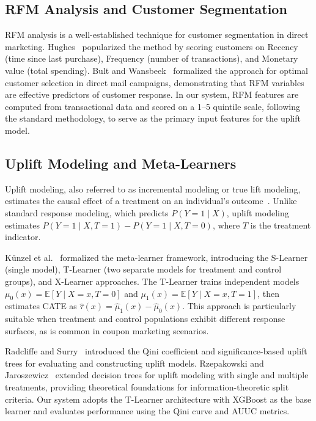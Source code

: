 \documentclass[11pt,a4paper,twoside]{article}
\begin{document}
\subsection{RFM Analysis and Customer Segmentation}

RFM analysis is a well-established technique for customer segmentation in direct marketing. Hughes~\cite{hughes1994} popularized the method by scoring customers on Recency (time since last purchase), Frequency (number of transactions), and Monetary value (total spending). Bult and Wansbeek~\cite{bult1995} formalized the approach for optimal customer selection in direct mail campaigns, demonstrating that RFM variables are effective predictors of customer response. In our system, RFM features are computed from transactional data and scored on a 1--5 quintile scale, following the standard methodology, to serve as the primary input features for the uplift model.

\subsection{Uplift Modeling and Meta-Learners}

Uplift modeling, also referred to as incremental modeling or true lift modeling, estimates the causal effect of a treatment on an individual's outcome~\cite{gutierrez2017}. Unlike standard response modeling, which predicts $P(Y=1 \mid X)$, uplift modeling estimates $P(Y=1 \mid X, T=1) - P(Y=1 \mid X, T=0)$, where $T$ is the treatment indicator.

K{\"u}nzel et al.~\cite{kunzel2019} formalized the meta-learner framework, introducing the S-Learner (single model), T-Learner (two separate models for treatment and control groups), and X-Learner approaches. The T-Learner trains independent models $\mu_0(x) = \mathbb{E}[Y \mid X=x, T=0]$ and $\mu_1(x) = \mathbb{E}[Y \mid X=x, T=1]$, then estimates CATE as $\hat{\tau}(x) = \hat{\mu}_1(x) - \hat{\mu}_0(x)$. This approach is particularly suitable when treatment and control populations exhibit different response surfaces, as is common in coupon marketing scenarios.

Radcliffe and Surry~\cite{radcliffe2011} introduced the Qini coefficient and significance-based uplift trees for evaluating and constructing uplift models. Rzepakowski and Jaroszewicz~\cite{rzepakowski2012} extended decision trees for uplift modeling with single and multiple treatments, providing theoretical foundations for information-theoretic split criteria. Our system adopts the T-Learner architecture with XGBoost as the base learner and evaluates performance using the Qini curve and AUUC metrics.
\end{document}
